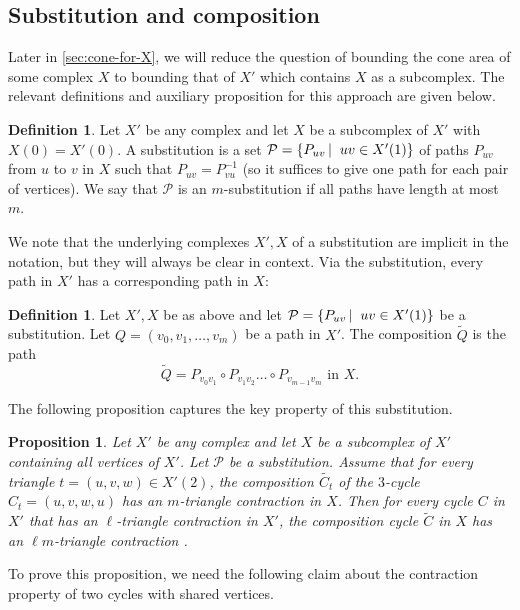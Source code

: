 \documentclass[10pt,a4paper]{article}
\newcommand{\prettyref}[1]{\cref{#1}}
\newtheorem{proposition}[theorem]{Proposition}
\theoremstyle{definition}
\newtheorem{definition}[theorem]{Definition}
\theoremstyle{remark}
\newcommand\sett[2]{\left\{ #1 \left| \; \vphantom{#1 #2} \right. #2  \right\}}
\numberwithin{equation}{section}
\let\pref=\prettyref
\begin{document}
\subsection{Substitution and composition}

Later in \pref{sec:cone-for-X}, we will reduce the question of bounding the cone area of some complex $X$ to bounding that of $X'$ which contains $X$ as a subcomplex. The relevant definitions and auxiliary proposition for this approach are given below.

\begin{definition}
    Let \(X'\) be any complex and let \(X\) be a subcomplex of \(X'\) with $X(0) = X'(0)$. A substitution is a set \(\mathcal{P} = \sett{P_{uv}}{uv \in X'(1)}\) of paths \(P_{uv}\) from $u$ to $v$ in \(X\) such that $P_{uv} = P^{-1}_{vu}$ (so it suffices to give one path for each pair of vertices). We say that \(\mathcal{P}\) is an \(m\)-substitution if all paths have length at most \(m\).
\end{definition}
We note that the underlying complexes $X',X$ of a substitution are implicit in the notation, but they will always be clear in context. Via the substitution, every path in $X'$ has a corresponding path in $X$:
\begin{definition}
    Let \(X',X\) be as above and let \(\mathcal{P} = \sett{P_{uv}}{uv \in X'(1)}\) be a substitution. Let \(Q=(v_0,v_1,\dots,v_m)\) be a path in \(X'\). The composition \(\tilde{Q}\) is the path
    \[\tilde{Q} = P_{v_0v_1} \circ P_{v_1 v_2} \dots \circ P_{v_{m-1}v_m} \text{ in }X.\]
\end{definition}

The following proposition captures the key property of this substitution.
\begin{proposition} \label{prop:cone-composition}
    Let \(X'\) be any complex and let \(X\) be a subcomplex of \(X'\) containing all vertices of $X'$. Let \(\mathcal{P}\) be a substitution. Assume that for every triangle \(t=(u,v,w) \in X'(2)\), the composition \(\tilde{C_t}\) of the \(3\)-cycle \(C_t=(u,v,w,u)\) has an \(m\)-triangle contraction in \(X\). Then for every cycle \(C\) in \(X'\) that has an \(\ell\)-triangle contraction in \(X'\), the composition cycle \(\tilde{C}\) in \(X\) has an \(\ell m\)-triangle contraction .
\end{proposition}

To prove this proposition, we need the following claim about the contraction property of two cycles with shared vertices.
\end{document}
